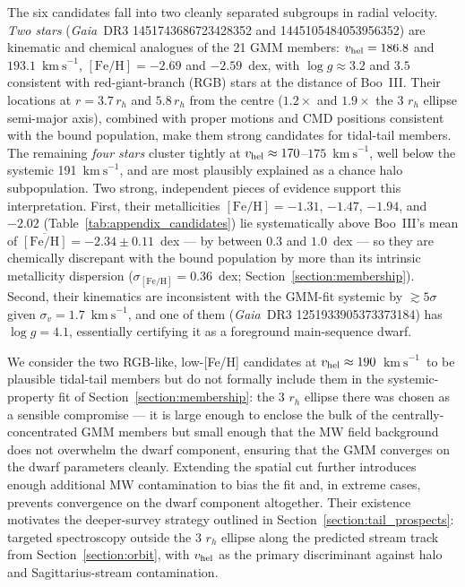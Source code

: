\documentclass[twocolumn, apj, numberedappendix, appendixfloats]{openjournal_dhayaa}
\newcommand{\gaia}{\textit{Gaia}\xspace}
\newcommand{\vlosUnits}{$\mathrm{km~s}^{-1}$\xspace}
\begin{document}
The six candidates fall into two cleanly separated subgroups in radial velocity.
\emph{Two stars} (\gaia\ DR3 1451743686723428352 and 1445105484053956352) are kinematic and chemical analogues of the 21 GMM members: $v_{\rm hel} = 186.8$ and $193.1$~\vlosUnits, $[\mathrm{Fe/H}] = -2.69$ and $-2.59$~dex, with $\log g \approx 3.2$ and $3.5$ consistent with red-giant-branch (RGB) stars at the distance of Boo~III.
Their locations at $r = 3.7\,r_h$ and $5.8\,r_h$ from the centre ($1.2\times$ and $1.9\times$ the 3 $r_h$ ellipse semi-major axis), combined with proper motions and CMD positions consistent with the bound population, make them strong candidates for tidal-tail members.
The remaining \emph{four stars} cluster tightly at $v_{\rm hel} \approx 170$--$175$~\vlosUnits, well below the systemic 191~\vlosUnits, and are most plausibly explained as a chance halo subpopulation. Two strong, independent pieces of evidence support this interpretation. First, their metallicities $[\mathrm{Fe/H}] = -1.31$, $-1.47$, $-1.94$, and $-2.02$ (Table~\ref{tab:appendix_candidates}) lie systematically above Boo~III's mean of $\overline{[\mathrm{Fe/H}]} = -2.34 \pm 0.11$~dex --- by between $0.3$ and $1.0$~dex --- so they are chemically discrepant with the bound population by more than its intrinsic metallicity dispersion ($\sigma_{[\mathrm{Fe/H}]} = 0.36$~dex; Section~\ref{section:membership}). Second, their kinematics are inconsistent with the GMM-fit systemic by $\gtrsim 5\sigma$ given $\sigma_v = 1.7$~\vlosUnits, and one of them (\gaia\ DR3 1251933905373373184) has $\log g = 4.1$, essentially certifying it as a foreground main-sequence dwarf.

We consider the two RGB-like, low-[Fe/H] candidates at $v_{\rm hel} \approx 190$~\vlosUnits\ to be plausible tidal-tail members but do not formally include them in the systemic-property fit of Section~\ref{section:membership}: the 3 $r_h$ ellipse there was chosen as a sensible compromise --- it is large enough to enclose the bulk of the centrally-concentrated GMM members but small enough that the MW field background does not overwhelm the dwarf component, ensuring that the GMM converges on the dwarf parameters cleanly. Extending the spatial cut further introduces enough additional MW contamination to bias the fit and, in extreme cases, prevents convergence on the dwarf component altogether.
Their existence motivates the deeper-survey strategy outlined in Section~\ref{section:tail_prospects}:
targeted spectroscopy outside the 3 $r_h$ ellipse along the predicted stream track from Section~\ref{section:orbit}, with $v_{\rm hel}$ as the primary discriminant against halo and Sagittarius-stream contamination.
\end{document}
